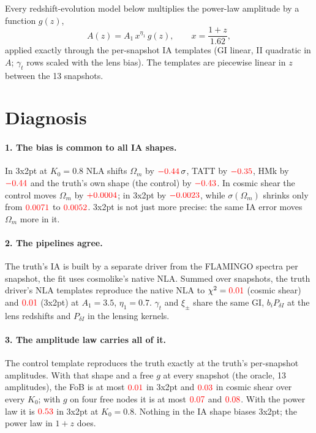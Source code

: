 \documentclass[11pt]{article}
\newcommand{\Om}{\Omega_m}
\newif\ifnumbersfinal
\newcommand{\refresh}[1]{\ifnumbersfinal#1\else\textcolor{red}{#1}\fi}
\begin{document}
Every redshift-evolution model below multiplies the power-law amplitude
by a function $g(z)$,
\begin{equation}
A(z)=A_1\,x^{\eta_1}\,g(z),\qquad x=\frac{1+z}{1.62},
\label{eq:g}
\end{equation}
applied exactly through the per-snapshot IA templates (GI linear, II
quadratic in $A$; $\gamma_t$ rows scaled with the lens bias). The
templates are piecewise linear in $z$ between the 13 snapshots.

\section{Diagnosis}
\label{sec:diag}

\paragraph{1. The bias is common to all IA shapes.} In 3x2pt at $K_0=0.8$
NLA shifts $\Om$ by $\refresh{\muOmTxNlaEight}\,\sigma$, TATT by
$\refresh{\muOmTxTattEight}$, HMk by $\refresh{\muOmTxHmkEight}$ and the
truth's own shape (the control) by $\refresh{\muOmTxCtrlEight}$. In cosmic
shear the control moves $\Om$ by $\refresh{\shiftOmCs}$; in 3x2pt by
$\refresh{\shiftOmTx}$, while $\sigma(\Om)$ shrinks only from
$\refresh{\sigOmCs}$ to $\refresh{\sigOmTx}$. 3x2pt is not just more
precise: the same IA error moves $\Om$ more in it.

\paragraph{2. The pipelines agree.} The truth's IA is built by a separate
driver from the FLAMINGO spectra per snapshot, the fit uses cosmolike's
native NLA. Summed over snapshots, the truth driver's NLA templates
reproduce the native NLA to $\chi^2=\refresh{\checkChiCs}$ (cosmic shear)
and $\refresh{\checkChiTx}$ (3x2pt) at $A_1=3.5$, $\eta_1=0.7$. $\gamma_t$
and $\xi_\pm$ share the same GI, $b_i P_{\delta I}$ at the lens redshifts
and $P_{\delta I}$ in the lensing kernels.

\paragraph{3. The amplitude law carries all of it.} The control template
reproduces the truth exactly at the truth's per-snapshot amplitudes. With
that shape and a free $g$ at every snapshot (the oracle, 13 amplitudes),
the FoB is at most $\refresh{\fobTxOracleMax}$ in 3x2pt and
$\refresh{\fobCsOracleMax}$ in cosmic shear over every $K_0$; with $g$ on
four free nodes it is at most $\refresh{\fobTxCtrlNdMax}$ and
$\refresh{\fobCsCtrlNdMax}$. With the power law it is
$\refresh{\fobTxCtrlEight}$ in 3x2pt at $K_0=0.8$. Nothing in the IA
shape biases 3x2pt; the power law in $1+z$ does.
\end{document}
